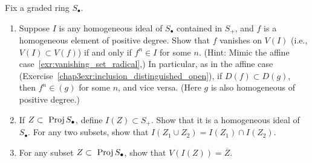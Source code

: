 \documentclass[11pt]{book} %
\begin{document}
\begin{exr}\label{chap4exr:4.5.H}
Fix a graded ring $S_\bullet$.
\begin{enumerate}[label=(\alph*)]
\item Suppose $I$ is any homogeneous ideal of $S_\bullet$ contained in $S_+$, and $f$ is a homogeneous element of positive degree. Show that $f$ vanishes on $V(I)$ (i.e.,$V(I) \subset V(f)$) if and only if $f^n ∈ I$ for some $n$. (Hint: Mimic the affine case~\ref{exr:vanishing_set_radical},) In particular, as in the affine case (Exercise~\ref{chap3exr:inclusion_distinguished_open}), if $D(f) \subset D(g)$, then $f^n \in (g)$ for some $n$, and vice versa. (Here $g$ is also homogeneous of positive degree.)
\item If $Z \subset \text{ Proj\,} S_\bullet$, define $I(Z) \subset S_+$. Show that it is a homogeneous ideal of $S_\bullet$. For any two subsets, show that $I(Z_1 \cup Z_2) = I(Z_1) \cap I(Z_2)$.
\item For any subset $Z \subset \text{ Proj\,} S_\bullet$, show that $V(I(Z)) = \overline{Z}$.
\end{enumerate}
\end{exr}
\end{document}
